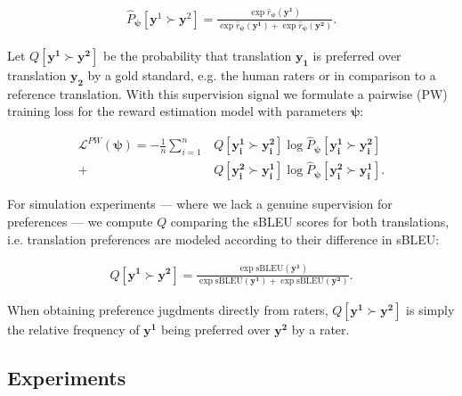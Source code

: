 \begin{align*}
\hat{P}_{\boldsymbol \psi}[\mathbf{y}^1 \succ \mathbf{y}^2] = \frac{\exp \hat{r}_{\boldsymbol \psi}(\mathbf{y^1})}{\exp \hat{r}_{\boldsymbol \psi}(\mathbf{y^1}) + \exp \hat{r}_{\boldsymbol \psi}(\mathbf{y^2})}.
\end{align*}

Let $Q[\mathbf{y^1} \succ \mathbf{y^2}]$ be the probability that translation $\mathbf{y_1}$ is preferred over translation $\mathbf{y_2}$ by a gold standard, e.g. the human raters or in comparison to a reference translation. With this supervision signal we formulate a pairwise (PW) training loss for the reward estimation model with parameters $\boldsymbol \psi$:

\begin{align*}
\mathcal{L}^{PW}(\boldsymbol \psi) = -\frac{1}{n}\sum^n_{i=1}&Q[\mathbf{y^1_i} \succ \mathbf{y^2_i}] \log \hat{P}_{\boldsymbol \psi}[\mathbf{y^1_i} \succ \mathbf{y^2_i}] \nonumber\\ 
+ &Q[\mathbf{y^2_i} \succ \mathbf{y^1_i}] \log \hat{P}_{\boldsymbol \psi}[\mathbf{y^2_i} \succ \mathbf{y^1_i}].
\end{align*}

For simulation experiments --- where we lack a genuine supervision for preferences --- we compute $Q$ comparing the sBLEU scores for both translations, i.e. translation preferences are modeled according to their difference in sBLEU:

\begin{align*}
Q[\mathbf{y^1} \succ \mathbf{y^2}] = \frac{\exp \text{sBLEU}(\mathbf{y^1})}{\exp \text{sBLEU}(\mathbf{y^1}) + \exp \text{sBLEU}(\mathbf{y^2})}.
\end{align*}

When obtaining preference jugdments directly from raters, $Q[\mathbf{y^1} \succ \mathbf{y^2}]$ is simply the relative frequency of $\mathbf{y^1}$ being preferred over $\mathbf{y^2}$ by a rater.

\subsection{Experiments}


